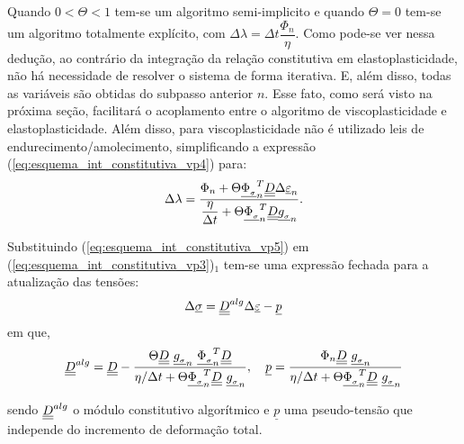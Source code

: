 Quando $0 < \Theta < 1$  tem-se um algoritmo semi-implicito e quando $\Theta = 0$ tem-se um algoritmo totalmente explícito, com $\Delta \lambda = \Delta t \dfrac{\Phi_n}{\eta}$. Como pode-se ver nessa dedução, ao contrário da integração da relação constitutiva em elastoplasticidade, não há necessidade de resolver o sistema de forma iterativa. E, além disso, todas as variáveis são obtidas do subpasso anterior $n$. Esse fato, como será visto na próxima seção, facilitará o acoplamento entre o algoritmo de viscoplasticidade e elastoplasticidade. Além disso, para viscoplasticidade não é utilizado leis de endurecimento/amolecimento, simplificando a expressão (\ref{eq:esquema_int_constitutiva_vp4}) para:
\begin{equation}
	\label{eq:esquema_int_constitutiva_vp5}
	\Delta \lambda = \dfrac{\Phi_n + \Theta \underline{\Phi_{_\sigma}}_n^T\underline{\underline D}\Delta\underline{\varepsilon}_n}{\dfrac{\eta}{\Delta t} + \Theta \underline{\Phi_{_\sigma}}_n^T\underline{\underline D}\underline{g_{_\sigma}}_n}.
\end{equation}

Substituindo (\ref{eq:esquema_int_constitutiva_vp5}) em (\ref{eq:esquema_int_constitutiva_vp3})$_1$ tem-se uma expressão fechada para a atualização das tensões:
\begin{equation}
	\label{eq:esquema_int_constitutiva_vp6}
	\Delta \underline \sigma = \underline{\underline D}^{alg} \Delta \underline{\varepsilon} - \underline p
\end{equation}
em que,
\begin{equation}
	\label{eq:esquema_int_constitutiva_vp6}
	\underline{\underline D}^{alg} = \underline{\underline D} - \dfrac{\Theta \underline{\underline D}~\underline{g_{_\sigma}}_n~\underline{\Phi_{_\sigma}}_n^T \underline{\underline D}}{\eta/\Delta t+ \Theta \underline{\Phi_{_\sigma}}_n^T\underline{\underline D}~\underline{g_{_\sigma}}_n},~~~\underline p = \dfrac{\Phi_n \underline{\underline D} ~\underline{g_{_\sigma}}_n}{\eta/\Delta t+ \Theta \underline{\Phi_{_\sigma}}_n^T\underline{\underline D}~\underline{g_{_\sigma}}_n}
\end{equation}

sendo $\underline{\underline D}^{alg}$ o módulo constitutivo algorítmico e $\underline p$ uma pseudo-tensão que independe do incremento de deformação total.


